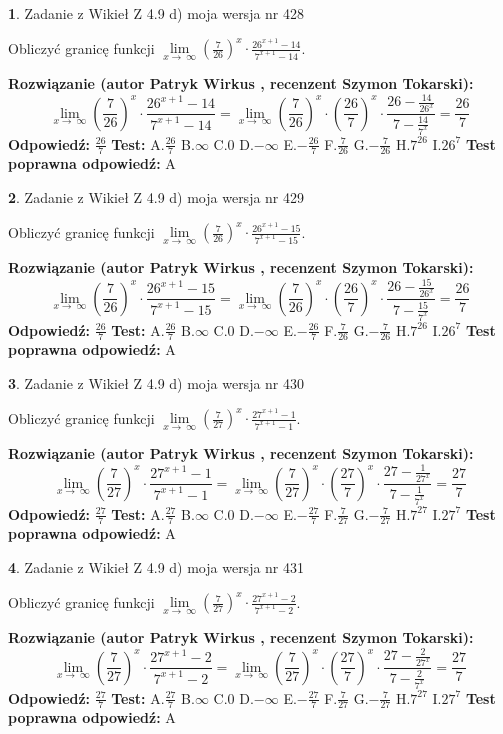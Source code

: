 \documentclass[12pt, a4paper]{article}
\theoremstyle{definition} %
\newtheorem{zad}{}
\newcommand{\zadStart}[1]{\begin{zad}#1\newline}
\newcommand{\zadStop}{\end{zad}}
\newcommand{\rozwStart}[2]{\noindent \textbf{Rozwiązanie (autor #1 , recenzent #2): }\newline}
\newcommand{\rozwStop}{\newline}
\newcommand{\odpStart}{\noindent \textbf{Odpowiedź:}\newline}
\newcommand{\odpStop}{\newline}
\newcommand{\testStart}{\noindent \textbf{Test:}\newline}
\newcommand{\testStop}{\newline}
\newcommand{\kluczStart}{\noindent \textbf{Test poprawna odpowiedź:}\newline}
\newcommand{\kluczStop}{\newline}
\begin{document}
\zadStart{Zadanie z Wikieł Z 4.9 d) moja wersja nr 428}


Obliczyć granicę funkcji  $\lim\limits_{x\to\ \infty}(\frac{7}{26})^{x}\cdot\frac{26^{x+1}-14}{7^{x+1}-14}$.
\zadStop
\rozwStart{Patryk Wirkus}{Szymon Tokarski}
$$\lim\limits_{x\to\ \infty}(\frac{7}{26})^{x}\cdot\frac{26^{x+1}-14}{7^{x+1}-14}=\lim\limits_{x\to\ \infty}(\frac{7}{26})^{x}\cdot(\frac{26}{7})^{x} \cdot \frac{26-\frac{14}{26^{x}}}{7-\frac{14}{7^{x}}} = \frac{26}{7}$$
\rozwStop
\odpStart
$\frac{26}{7}$
\odpStop
\testStart
A.$\frac{26}{7}$ B.$\infty$ C.$0$ D.$-\infty$ E.$-\frac{26}{7}$
F.$\frac{7}{26}$ G.$-\frac{7}{26}$
H.$7^{26}$
I.$26^{7}$
\testStop
\kluczStart
A
\kluczStop



\zadStart{Zadanie z Wikieł Z 4.9 d) moja wersja nr 429}


Obliczyć granicę funkcji  $\lim\limits_{x\to\ \infty}(\frac{7}{26})^{x}\cdot\frac{26^{x+1}-15}{7^{x+1}-15}$.
\zadStop
\rozwStart{Patryk Wirkus}{Szymon Tokarski}
$$\lim\limits_{x\to\ \infty}(\frac{7}{26})^{x}\cdot\frac{26^{x+1}-15}{7^{x+1}-15}=\lim\limits_{x\to\ \infty}(\frac{7}{26})^{x}\cdot(\frac{26}{7})^{x} \cdot \frac{26-\frac{15}{26^{x}}}{7-\frac{15}{7^{x}}} = \frac{26}{7}$$
\rozwStop
\odpStart
$\frac{26}{7}$
\odpStop
\testStart
A.$\frac{26}{7}$ B.$\infty$ C.$0$ D.$-\infty$ E.$-\frac{26}{7}$
F.$\frac{7}{26}$ G.$-\frac{7}{26}$
H.$7^{26}$
I.$26^{7}$
\testStop
\kluczStart
A
\kluczStop



\zadStart{Zadanie z Wikieł Z 4.9 d) moja wersja nr 430}


Obliczyć granicę funkcji  $\lim\limits_{x\to\ \infty}(\frac{7}{27})^{x}\cdot\frac{27^{x+1}-1}{7^{x+1}-1}$.
\zadStop
\rozwStart{Patryk Wirkus}{Szymon Tokarski}
$$\lim\limits_{x\to\ \infty}(\frac{7}{27})^{x}\cdot\frac{27^{x+1}-1}{7^{x+1}-1}=\lim\limits_{x\to\ \infty}(\frac{7}{27})^{x}\cdot(\frac{27}{7})^{x} \cdot \frac{27-\frac{1}{27^{x}}}{7-\frac{1}{7^{x}}} = \frac{27}{7}$$
\rozwStop
\odpStart
$\frac{27}{7}$
\odpStop
\testStart
A.$\frac{27}{7}$ B.$\infty$ C.$0$ D.$-\infty$ E.$-\frac{27}{7}$
F.$\frac{7}{27}$ G.$-\frac{7}{27}$
H.$7^{27}$
I.$27^{7}$
\testStop
\kluczStart
A
\kluczStop



\zadStart{Zadanie z Wikieł Z 4.9 d) moja wersja nr 431}


Obliczyć granicę funkcji  $\lim\limits_{x\to\ \infty}(\frac{7}{27})^{x}\cdot\frac{27^{x+1}-2}{7^{x+1}-2}$.
\zadStop
\rozwStart{Patryk Wirkus}{Szymon Tokarski}
$$\lim\limits_{x\to\ \infty}(\frac{7}{27})^{x}\cdot\frac{27^{x+1}-2}{7^{x+1}-2}=\lim\limits_{x\to\ \infty}(\frac{7}{27})^{x}\cdot(\frac{27}{7})^{x} \cdot \frac{27-\frac{2}{27^{x}}}{7-\frac{2}{7^{x}}} = \frac{27}{7}$$
\rozwStop
\odpStart
$\frac{27}{7}$
\odpStop
\testStart
A.$\frac{27}{7}$ B.$\infty$ C.$0$ D.$-\infty$ E.$-\frac{27}{7}$
F.$\frac{7}{27}$ G.$-\frac{7}{27}$
H.$7^{27}$
I.$27^{7}$
\testStop
\kluczStart
A
\kluczStop
\end{document}
